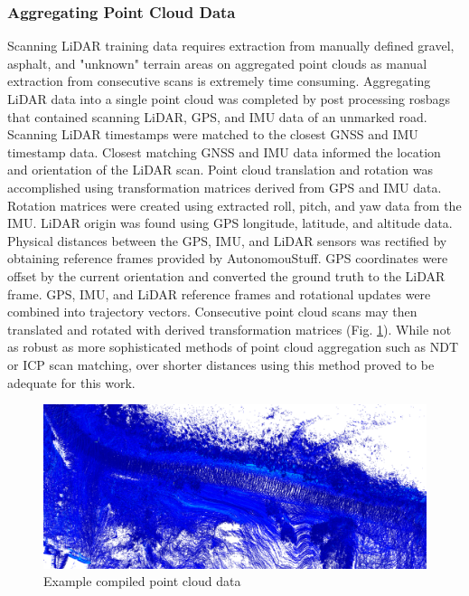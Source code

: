 \documentclass[numbered,pdftex]{ohio-etd}
\begin{document}
{{{			\subsubsection{Aggregating Point Cloud Data}\label{sec:aggregating_point_cloud_data}{
			
				{Scanning LiDAR training data requires extraction from manually defined gravel, asphalt, and "unknown" terrain areas on aggregated point clouds as manual extraction from consecutive scans is extremely time consuming. Aggregating LiDAR data into a single point cloud was completed by post processing rosbags that contained scanning LiDAR, GPS, and IMU data of an unmarked road. Scanning LiDAR timestamps were matched to the closest GNSS and IMU timestamp data. Closest matching GNSS and IMU data informed the location and orientation of the LiDAR scan. Point cloud translation and rotation was accomplished using transformation matrices derived from GPS and IMU data. Rotation matrices were created using extracted roll, pitch, and yaw data from the IMU. LiDAR origin was found using GPS longitude, latitude, and altitude data. Physical distances between the GPS, IMU, and LiDAR sensors was rectified by obtaining reference frames provided by AutonomouStuff. GPS coordinates were offset by the current orientation and converted the ground truth to the LiDAR frame. GPS, IMU, and LiDAR reference frames and rotational updates were combined into trajectory vectors. Consecutive point cloud scans may then translated and rotated with derived transformation matrices (Fig. \ref{fig:Compiled_PCD}). While not as robust as more sophisticated methods of point cloud aggregation such as NDT or ICP scan matching, over shorter distances using this method proved to be adequate for this work.} 
				
				\begin{figure}[H]
					\centering
					\includegraphics[width=0.7\linewidth]{Defense_Images/pc_example}
					\caption[Compiled Point Cloud Data]{Example compiled point cloud data}
					\label{fig:Compiled_PCD}
				\end{figure}
			
}}}}
\end{document}
